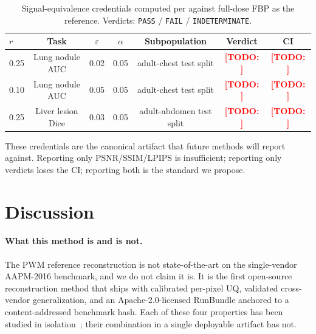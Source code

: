 \documentclass{article}  %
\newcommand{\todo}[1]{\textcolor{red}{\textbf{[TODO: #1]}}}
\begin{document}
\begin{table}[h]
    \centering
    \footnotesize
    \begin{tabular}{lcccccc}
        \toprule
        $r$ & Task & $\varepsilon$ & $\alpha$ & Subpopulation & Verdict & CI \\
        \midrule
        0.25 & Lung nodule AUC & 0.02 & 0.05 & adult-chest test split  & \todo{} & \todo{} \\
        0.10 & Lung nodule AUC & 0.05 & 0.05 & adult-chest test split  & \todo{} & \todo{} \\
        0.25 & Liver lesion Dice & 0.03 & 0.05 & adult-abdomen test split & \todo{} & \todo{} \\
        \bottomrule
    \end{tabular}
    \caption{Signal-equivalence credentials computed per \citet{ws2framework} against full-dose FBP as the reference. Verdicts: \texttt{PASS} / \texttt{FAIL} / \texttt{INDETERMINATE}.}
    \label{tab:credentials}
\end{table}

These credentials are the canonical artifact that future methods will report against. Reporting only PSNR/SSIM/LPIPS is insufficient; reporting only verdicts loses the CI; reporting both is the standard we propose.

\section{Discussion}
\label{sec:discussion}

\paragraph{What this method is and is not.} The PWM reference reconstruction is not state-of-the-art on the single-vendor AAPM-2016 benchmark, and we do not claim it is. It is the first open-source reconstruction method that ships with calibrated per-pixel UQ, validated cross-vendor generalization, and an Apache-2.0-licensed RunBundle anchored to a content-addressed benchmark hash. Each of these four properties has been studied in isolation~\citep{lakshminarayanan2017deep,karani2018lifelong,chen2017redcnn}; their combination in a single deployable artifact has not.
\end{document}
